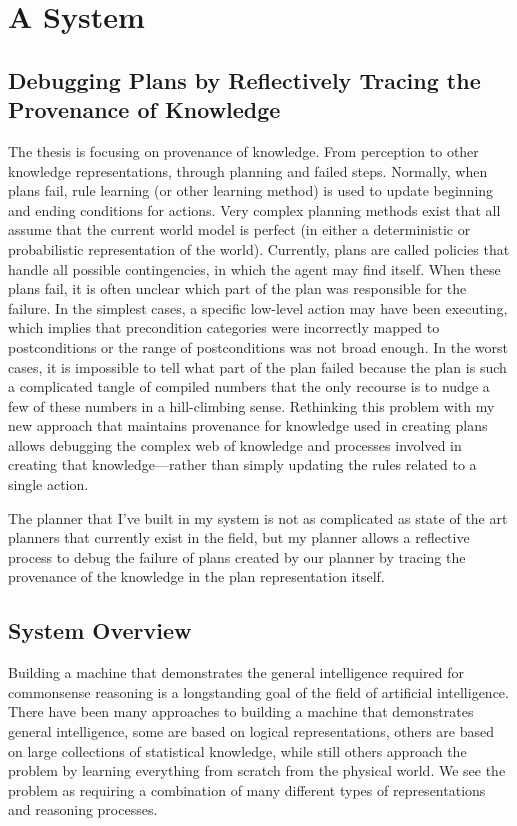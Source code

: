\chapter{A System}\label{ch:a_system}

\section{Debugging Plans by Reflectively Tracing the Provenance of Knowledge}

The thesis is focusing on provenance of knowledge.  From perception to
other knowledge representations, through planning and failed steps.
Normally, when plans fail, rule learning (or other learning method) is
used to update beginning and ending conditions for actions.  Very
complex planning methods exist that all assume that the current world
model is perfect (in either a deterministic or probabilistic
representation of the world).  Currently, plans are called policies
that handle all possible contingencies, in which the agent may find
itself.  When these plans fail, it is often unclear which part of the
plan was responsible for the failure.  In the simplest cases, a
specific low-level action may have been executing, which implies that
precondition categories were incorrectly mapped to postconditions or
the range of postconditions was not broad enough.  In the worst cases,
it is impossible to tell what part of the plan failed because the plan
is such a complicated tangle of compiled numbers that the only
recourse is to nudge a few of these numbers in a hill-climbing sense.
Rethinking this problem with my new approach that maintains provenance
for knowledge used in creating plans allows debugging the complex web
of knowledge and processes involved in creating that
knowledge---rather than simply updating the rules related to a single
action.

The planner that I've built in my system is not as complicated as
state of the art planners that currently exist in the field, but my
planner allows a reflective process to debug the failure of plans
created by our planner by tracing the provenance of the knowledge in
the plan representation itself.

\section{System Overview}

Building a machine that demonstrates the general intelligence required
for commonsense reasoning is a longstanding goal of the field of
artificial intelligence.  There have been many approaches to building
a machine that demonstrates general intelligence, some are based on
logical representations, others are based on large collections of
statistical knowledge, while still others approach the problem by
learning everything from scratch from the physical world.  We see the
problem as requiring a combination of many different types of
representations and reasoning processes.

